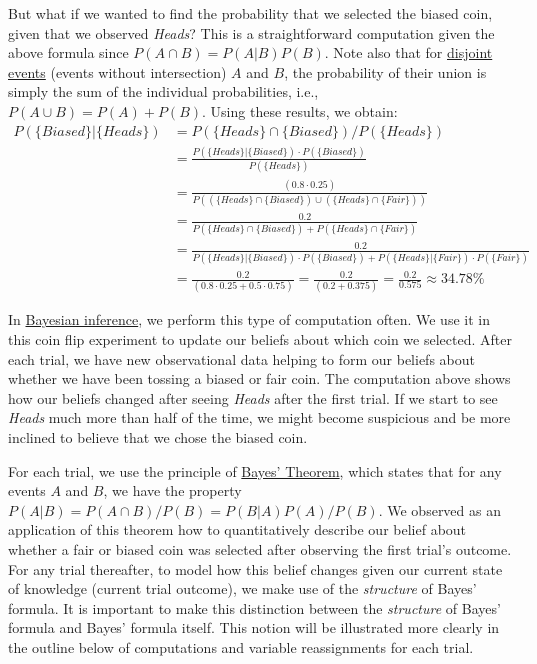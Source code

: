But what if we wanted to find the probability that we selected the biased coin, given that we observed \textit{Heads}? This is a straightforward computation given the above formula since $P(A \cap B) = P(A|B)P(B)$. Note also that for \href{https://en.wikipedia.org/wiki/Mutual_exclusivity}{disjoint events} (events without intersection) $A$ and $B$, the probability of their union is simply the sum of the individual probabilities, i.e., $P(A \cup B) = P(A) + P(B)$. Using these results, we obtain:
\begin{align*}
    P(\{\textit{Biased}\} | \{\textit{Heads}\}) &=  P(\{\textit{Heads}\} \cap \{\textit{Biased}\})/P(\{\textit{Heads}\}) \\
    &= \frac{P(\{\textit{Heads}\} | \{\textit{Biased}\}) \cdot P(\{\textit{Biased}\})}{P(\{\textit{Heads}\})} \\
   &= \frac{(0.8\cdot0.25)}{P((\{\textit{Heads}\}\cap\{\textit{Biased}\}) \cup (\{\textit{Heads}\}\cap\{\textit{Fair}\}))} \\
    &= \frac{0.2}{P(\{\textit{Heads}\}\cap\{\textit{Biased}\}) + P(\{\textit{Heads}\}\cap\{\textit{Fair}\})} \\
    &= \frac{0.2}{P(\{\textit{Heads}\} | \{\textit{Biased}\}) \cdot P(\{\textit{Biased}\}) + P(\{\textit{Heads}\} | \{\textit{Fair}\}) \cdot P(\{\textit{Fair}\})} \\
    &= \frac{0.2}{(0.8\cdot0.25 + 0.5\cdot0.75)} = \frac{0.2}{(0.2 + 0.375)} = \frac{0.2}{0.575} \approx 34.78\%
\end{align*}

In \href{https://en.wikipedia.org/wiki/Bayesian_inference}{Bayesian inference}, we perform this type of computation often. We use it in this coin flip experiment to update our beliefs about which coin we selected. After each trial, we have new observational data helping to form our beliefs about whether we have been tossing a biased or fair coin. The computation above shows how our beliefs changed after seeing \textit{Heads} after the first trial. If we start to see \textit{Heads} much more than half of the time, we might become suspicious and be more inclined to believe that we chose the biased coin.

For each trial, we use the principle of \href{https://en.wikipedia.org/wiki/Bayes'_theorem}{Bayes' Theorem}, which states that for any events $A$ and $B$, we have the property $P(A | B) = P(A \cap B)/P(B) = P(B|A)P(A)/P(B)$. We observed as an application of this theorem how to quantitatively describe our belief about whether a fair or biased coin was selected after observing the first trial's outcome. For any trial thereafter, to model how this belief changes given our current state of knowledge (current trial outcome), we make use of the \textit{structure} of Bayes' formula. It is important to make this distinction between the \textit{structure} of Bayes' formula and Bayes' formula itself. This notion will be illustrated more clearly in the outline below of computations and variable reassignments for each trial.

